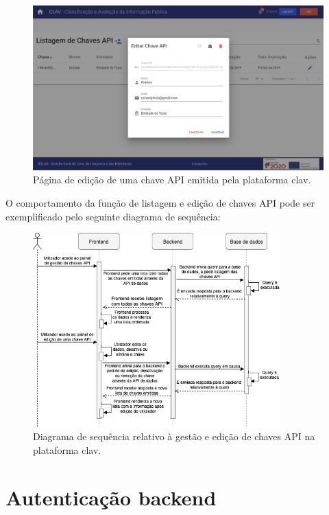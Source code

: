 \begin{figure}[H]
    \centering
    \includegraphics[width=\textwidth]{img/clav/gestaoAPI/editarChave.png}
    \caption{Página de edição de uma chave API emitida pela plataforma \gls{clav}.}
    \label{fig:edicaoChavesAPI}
\end{figure}

\vspace{-5mm}
O comportamento da função de listagem e edição de chaves API pode ser exemplificado pelo seguinte diagrama de sequência:
\vspace{-2mm}
\begin{figure}[H]
    \centering
    \includegraphics[width=0.85\textwidth]{img/diagramas/sequencia/DiagramasSequencia-GestaoAPI.png}
    \caption{Diagrama de sequência relativo à gestão e edição de chaves API na plataforma \gls{clav}.}
    \label{fig:diagramaSequenciaGestaoAPI}
\end{figure}

\cleardoublepage
\section{Autenticação backend}

